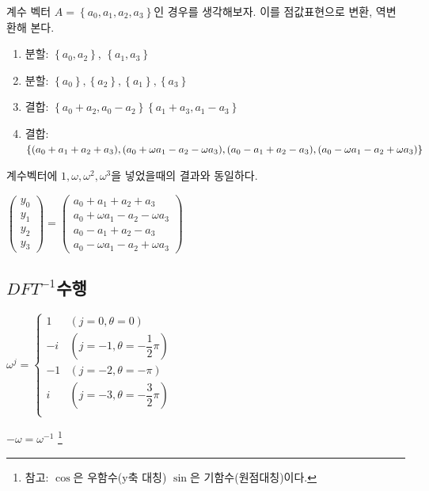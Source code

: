 계수 벡터 $A = \left\{a_0, a_1, a_2, a_3 \right\}$인 경우를 생각해보자. 이를 점값표현으로 변환, 역변환해 본다.

\begin{enumerate}
    \item 분할: $\left\{a_0, a_2 \right\}$, $\left\{a_1, a_3\right\}$
    \item 분할: $\left\{a_0\right\}, \left\{a_2\right\}, \left\{a_1\right\}, \left\{a_3\right\}$
    \item 결합: $\left\{a_0 + a_2, a_0 - a_2 \right\}\left\{a_1 + a_3, a_1 - a_3\right\}$
    \item 결합: $\left\{(a_0 + a_1 + a_2 + a_3), (a_0 + \omega a_1 - a_2 -\omega a_3) , \\(a_0 - a_1 + a_2 - a_3), (a_0 - \omega a_1 - a_2 + \omega a_3) \right\}$
\end{enumerate}

계수벡터에 $1, \omega ,\omega^2 , \omega^3 $을 넣었을때의 결과와 동일하다.

$
\begin{pmatrix}
    y_0 \\ 
    y_1 \\
    y_2 \\
    y_3 
\end{pmatrix}
=
\begin{pmatrix}
    a_0 + a_1 + a_2 + a_3 \\ 
    a_0 + \omega a_1 - a_2 -\omega a_3 \\
    a_0 - a_1 + a_2 - a_3 \\
    a_0 - \omega a_1 - a_2 + \omega a_3
\end{pmatrix}
$


\subsection{$DFT^{-1}$수행}

$
\omega^j = \left\{
\begin{array}{rl}
    1 & ( j = 0, \theta = 0 ) \\
    -i & ( j = -1, \theta = -\dfrac{1}{2}\pi) \\
    -1 & ( j = -2, \theta = -\pi ) \\
    i & ( j = -3, \theta = -\dfrac{3}{2}\pi ) \\
\end{array}
\right.
$


$-\omega = \omega^{-1}$
\footnote{참고: $\cos$은 우함수(y축 대칭) $\sin$은 기함수(원점대칭)이다. }

